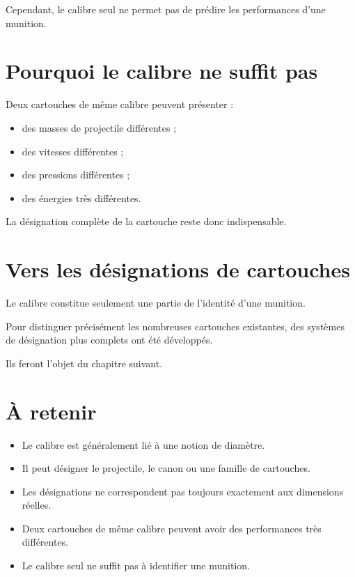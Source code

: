 Cependant, le calibre seul ne permet pas de prédire les performances d'une
munition.

\section{Pourquoi le calibre ne suffit pas}

Deux cartouches de même calibre peuvent présenter :

\begin{itemize}
    \item des masses de projectile différentes ;
    \item des vitesses différentes ;
    \item des pressions différentes ;
    \item des énergies très différentes.
\end{itemize}

La désignation complète de la cartouche reste donc indispensable.

\section{Vers les désignations de cartouches}

Le calibre constitue seulement une partie de l'identité d'une munition.

Pour distinguer précisément les nombreuses cartouches existantes, des
systèmes de désignation plus complets ont été développés.

Ils feront l'objet du chapitre suivant.

\section{À retenir}

\begin{aretenir}

\begin{itemize}
    \item Le calibre est généralement lié à une notion de diamètre.
    \item Il peut désigner le projectile, le canon ou une famille de
          cartouches.
    \item Les désignations ne correspondent pas toujours exactement aux
          dimensions réelles.
    \item Deux cartouches de même calibre peuvent avoir des performances très
          différentes.
    \item Le calibre seul ne suffit pas à identifier une munition.
\end{itemize}

\end{aretenir}
